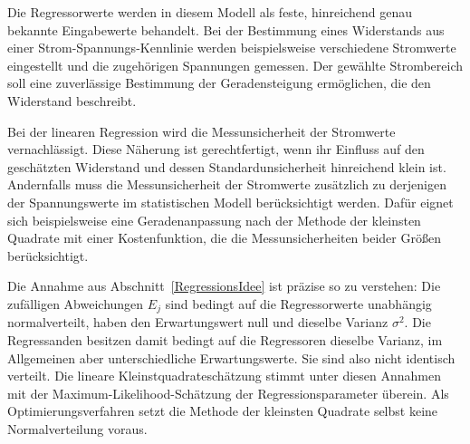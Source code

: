 Die Regressorwerte werden in diesem Modell als feste, hinreichend
genau bekannte Eingabewerte behandelt. Bei der Bestimmung eines
Widerstands aus einer Strom-Spannungs-Kennlinie werden beispielsweise
verschiedene Stromwerte eingestellt und die zugehörigen Spannungen
gemessen. Der gewählte Strombereich soll eine zuverlässige Bestimmung
der Geradensteigung ermöglichen, die den Widerstand beschreibt.

Bei der linearen Regression wird die Messunsicherheit
der Stromwerte vernachlässigt. Diese Näherung ist gerechtfertigt,
wenn ihr Einfluss auf den geschätzten Widerstand und dessen
Standardunsicherheit hinreichend klein ist. Andernfalls muss die
Messunsicherheit der Stromwerte zusätzlich zu derjenigen der
Spannungswerte im statistischen Modell berücksichtigt werden.
Dafür eignet sich beispielsweise eine Geradenanpassung nach der
Methode der kleinsten Quadrate mit einer Kostenfunktion, die die
Messunsicherheiten beider Größen berücksichtigt.

Die Annahme aus Abschnitt~\ref{RegressionsIdee} ist präzise so zu verstehen:
Die zufälligen Abweichungen $E_j$ sind bedingt auf die Regressorwerte
unabhängig normalverteilt, haben den Erwartungswert
null und dieselbe Varianz $\sigma^2$. Die Regressanden besitzen damit
bedingt auf die Regressoren dieselbe Varianz, im Allgemeinen aber
unterschiedliche Erwartungswerte. Sie sind also nicht identisch verteilt.
Die lineare Kleinstquadrateschätzung stimmt unter diesen Annahmen mit
der Maximum-Likelihood-Schätzung der Regressionsparameter überein.
Als Optimierungsverfahren setzt die Methode der kleinsten Quadrate
selbst keine Normalverteilung voraus.

